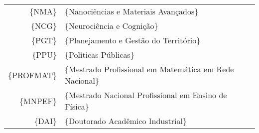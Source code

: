 \begin{table}[H]
\begin{tabular}{r|l}
		\{NMA\}                                              & \{Nanociências e Materiais Avançados\}                               \\
		\{NCG\}                                              & \{Neurociência e Cognição\}                                          \\
		\{PGT\}                                              & \{Planejamento e Gestão do Território\}                              \\
		\{PPU\}                                              & \{Políticas Públicas\}                                               \\ %
		\{PROFMAT\}                                          & \{Mestrado Profissional em Matemática em Rede Nacional\}             \\
		\{MNPEF\}                                            & \{Mestrado Nacional Profissional em Ensino de Física\}               \\ %
		\{DAI\}                                              & \{Doutorado Acadêmico Industrial\}                                             
	\end{tabular}
\end{table}

